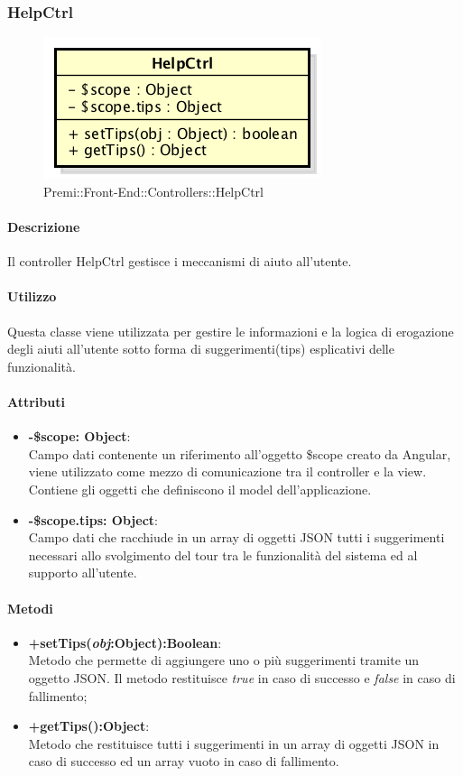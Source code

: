 \newpage

\subsubsection{HelpCtrl}
\begin{figure}[h]
	\centering
	\includegraphics[width=0.4\linewidth]{img/premi_front_end_controllers_helpctrl}
	\caption[Premi::Front-End::Controllers::HelpCtrl]{Premi::Front-End::Controllers::HelpCtrl}
\end{figure}
      \paragraph{Descrizione}
	Il controller HelpCtrl gestisce i meccanismi di aiuto all'utente.

	\paragraph{Utilizzo}
	Questa classe viene utilizzata per gestire le informazioni e la logica di erogazione degli aiuti all'utente sotto forma di suggerimenti(tips) esplicativi delle funzionalità.

	\paragraph{Attributi}
	\begin{itemize}
		\item \textbf{-\$scope: Object}:\\
				Campo dati contenente un riferimento all'oggetto \$scope creato da Angular, viene utilizzato come mezzo di comunicazione tra il controller e la view. Contiene gli oggetti che definiscono il model dell'applicazione.
		\item \textbf{-\$scope.tips: Object}:\\
				Campo dati che racchiude in un array di oggetti JSON tutti i suggerimenti necessari allo svolgimento del tour tra le funzionalità del sistema ed al supporto all'utente.
	\end{itemize}

	\paragraph{Metodi}
	\begin{itemize}
	  \item \textbf{+setTips(\textit{obj}:Object):Boolean}:\\
		  Metodo che permette di aggiungere uno o più suggerimenti tramite un oggetto JSON. Il metodo restituisce \textit{true} in caso di successo e \textit{false} in caso di fallimento;
	  \item \textbf{+getTips():Object}:\\
		  Metodo che restituisce tutti i suggerimenti in un array di oggetti JSON in caso di successo ed un array vuoto in caso di fallimento.
	\end{itemize}

